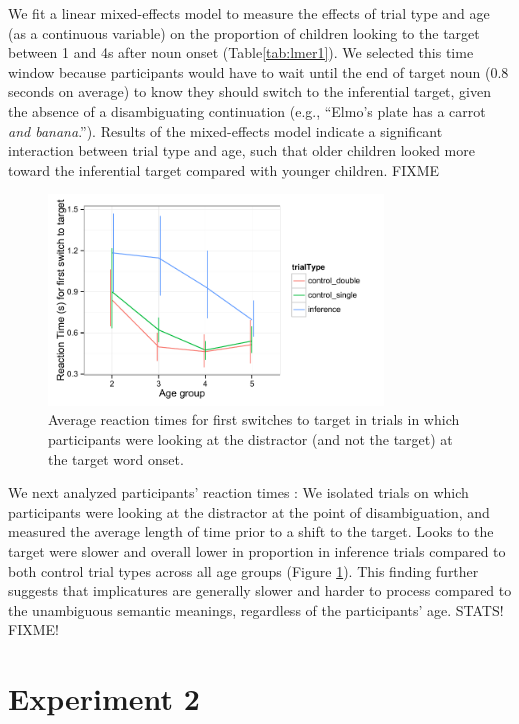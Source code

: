 \documentclass[10pt,letterpaper]{article}
\begin{document}
We fit a linear mixed-effects model to measure the effects of trial type and age (as a continuous variable) on the proportion of children looking to the target between 1 and 4s after noun onset (Table\ref{tab:lmer1}). We selected this time window because participants would have to wait until the end of target noun (0.8 seconds on average) to know they should switch to the inferential target, given the absence of a disambiguating continuation (e.g., ``Elmo's plate has a carrot \emph{and banana}.''). Results of the mixed-effects model indicate a significant interaction between trial type and age, such that older children looked more toward the inferential target compared with younger children. FIXME


\begin{figure}
\begin{centering} 
\includegraphics[width=3.5in]{figures/150116-0-rt_age.pdf}
\caption{\label{fig:rt} Average reaction times for first switches to target in trials in which participants were looking at the distractor (and not the target) at the target word onset.}
\end{centering} 

\end{figure}

We next analyzed participants' reaction times \cite{fernald2008looking}: We isolated trials on which participants were looking at the distractor at the point of disambiguation, and measured the average length of time prior to a shift to the target. Looks to the target were slower and overall lower in proportion in inference trials compared to both control trial types across all age groups (Figure \ref{fig:rt}). This finding further suggests that implicatures are generally slower and harder to process compared to the unambiguous semantic meanings, regardless of the participants' age. STATS! FIXME!

\section{Experiment 2}
\end{document}
